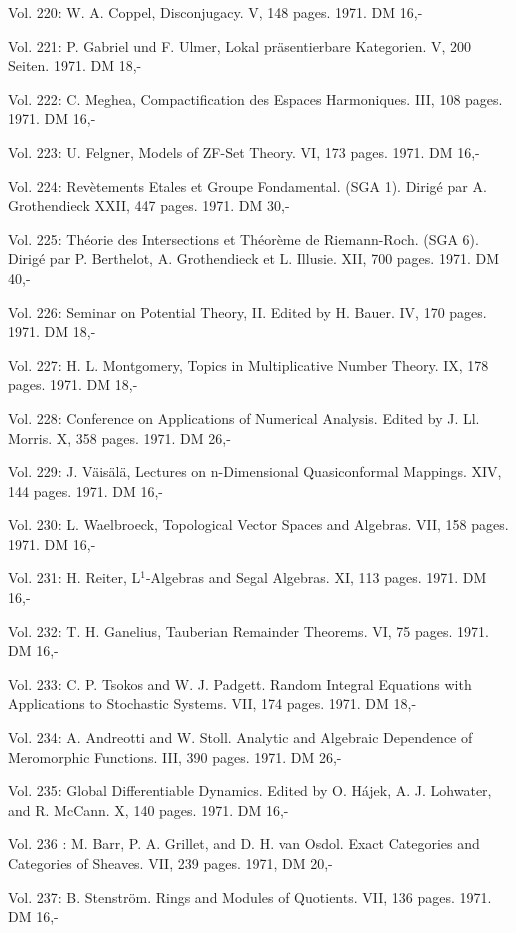 Vol. 220: W. A. Coppel, Disconjugacy. V, 148 pages. 1971. DM 16,-

Vol. 221: P. Gabriel und F. Ulmer, Lokal präsentierbare Kategorien. V, 200 Seiten. 1971. DM 18,-

Vol. 222: C. Meghea, Compactification des Espaces Harmoniques. III, 108 pages. 1971. DM 16,-

Vol. 223: U. Felgner, Models of ZF-Set Theory. VI, 173 pages. 1971. DM 16,-

Vol. 224: Revètements Etales et Groupe Fondamental. (SGA 1). Dirigé par A. Grothendieck XXII, 447 pages. 1971. DM 30,-

Vol. 225: Théorie des Intersections et Théorème de Riemann-Roch. (SGA 6). Dirigé par P. Berthelot, A. Grothendieck et L. Illusie. XII, 700 pages. 1971. DM 40,-

Vol. 226: Seminar on Potential Theory, II. Edited by H. Bauer. IV, 170 pages. 1971. DM 18,-

Vol. 227: H. L. Montgomery, Topics in Multiplicative Number Theory. IX, 178 pages. 1971. DM 18,-

Vol. 228: Conference on Applications of Numerical Analysis. Edited by J. Ll. Morris. X, 358 pages. 1971. DM 26,-

Vol. 229: J. Väisälä, Lectures on n-Dimensional Quasiconformal Mappings. XIV, 144 pages. 1971. DM 16,-

Vol. 230: L. Waelbroeck, Topological Vector Spaces and Algebras. VII, 158 pages. 1971. DM 16,-

Vol. 231: H. Reiter, L$^1$-Algebras and Segal Algebras. XI, 113 pages. 1971. DM 16,-

Vol. 232: T. H. Ganelius, Tauberian Remainder Theorems. VI, 75 pages. 1971. DM 16,-

Vol. 233: C. P. Tsokos and W. J. Padgett. Random Integral Equations with Applications to Stochastic Systems. VII, 174 pages. 1971. DM 18,-

Vol. 234: A. Andreotti and W. Stoll. Analytic and Algebraic Dependence of Meromorphic Functions. III, 390 pages. 1971. DM 26,-

Vol. 235: Global Differentiable Dynamics. Edited by O. Hájek, A. J. Lohwater, and R. McCann. X, 140 pages. 1971. DM 16,-

Vol. 236 : M. Barr, P. A. Grillet, and D. H. van Osdol. Exact Categories and Categories of Sheaves. VII, 239 pages. 1971, DM 20,-

Vol. 237: B. Stenström. Rings and Modules of Quotients. VII, 136 pages. 1971. DM 16,-

